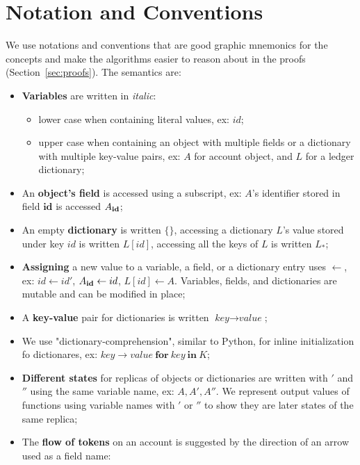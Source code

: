 \documentclass[9pt, oneside]{article}   	%
\begin{document}
\section{Notation and Conventions}
\label{apdx:notation}

We use notations and conventions that are good graphic mnemonics for the concepts and make the algorithms easier to reason about in the proofs (Section~\ref{sec:proofs}). The semantics are:

\begin{itemize}
	\item \textbf{Variables} are written in \textit{italic}:
		\begin{itemize}
			\item  lower case when containing literal values, ex: $id$;
			\item upper case when containing an object with multiple fields or a dictionary with multiple key-value pairs, ex: $A$ for account object, and $L$ for a ledger dictionary;
		\end{itemize}
	\item An \textbf{object's field} is accessed using a subscript, ex: $A$'s identifier stored in field $\textbf{id}$ is accessed $A_{\scriptsize \textbf{id}}$;
	\item An empty \textbf{dictionary} is written $\{\}$, accessing a dictionary $L$'s value stored under key $id$ is written $L[id]$, accessing all the keys of $L$ is written $L_*$;
	\item \textbf{Assigning} a new value to a variable, a field, or a dictionary entry uses $\leftarrow$, ex: $id \leftarrow id'$, $A_{\scriptsize\textbf{id}} \leftarrow id$, $L[id] \leftarrow A$. Variables, fields, and dictionaries are mutable and can be modified in place;
	 \item A \textbf{key-value} pair for dictionaries is written $\textit{key} \rightarrow \textit{value}$;
	 \item We use "dictionary-comprehension", similar to Python, for inline initialization fo dictionares, ex: ${ \textit{key} \rightarrow \textit{value} ~\textbf{for}~ \textit{key} ~\textbf{in}~ K }$;
	\item \textbf{Different states} for replicas of objects or dictionaries are written with $'$ and $''$ using the same variable name, ex: $A, A', A''$. We represent output values of functions using variable names with $'$ or $''$ to show they are later states of the same replica;
	\item The  \textbf{flow of tokens} on an account is suggested by the direction of an arrow used as a field name: 

\end{itemize}
\end{document}
